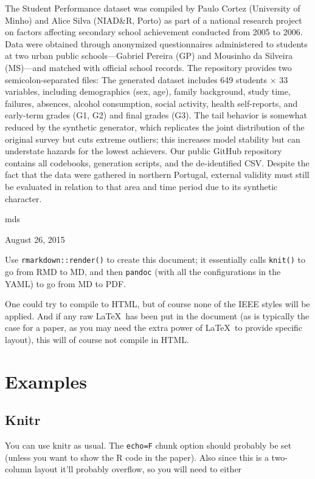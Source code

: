 \documentclass[a4paper,conference]{IEEEtran}
\begin{document}
The Student Performance dataset was compiled by Paulo Cortez (University
of Minho) and Alice Silva (NIAD\&R, Porto) as part of a national
research project on factors affecting secondary school achievement
conducted from 2005 to 2006. Data were obtained through anonymized
questionnaires administered to students at two urban public
schools---Gabriel Pereira (GP) and Mousinho da Silveira (MS)---and
matched with official school records. The repository provides two
semicolon-separated files: The generated dataset includes 649 students ×
33 variables, including demographics (sex, age), family background,
study time, failures, absences, alcohol consumption, social activity,
health self-reports, and early-term grades (G1, G2) and final grades
(G3). The tail behavior is somewhat reduced by the synthetic generator,
which replicates the joint distribution of the original survey but cuts
extreme outliers; this increases model stability but can understate
hazards for the lowest achievers. Our public GitHub repository contains
all codebooks, generation scripts, and the de-identified CSV. Despite
the fact that the data were gathered in northern Portugal, external
validity must still be evaluated in relation to that area and time
period due to its synthetic character.

\hfill mds

\hfill August 26, 2015

Use \texttt{rmarkdown::render()} to create this document; it essentially
calls \texttt{knit()} to go from RMD to MD, and then \texttt{pandoc}
(with all the configurations in the YAML) to go from MD to PDF.

One could try to compile to HTML, but of course none of the IEEE styles
will be applied. And if any raw \LaTeX~has been put in the document (as
is typically the case for a paper, as you may need the extra power of
\LaTeX~to provide specific layout), this will of course not compile in
HTML.

\section{Examples}\label{sec:examples}

\subsection{Knitr}\label{sec:knitr}

You can use knitr as usual. The \texttt{echo=F} chunk option should
probably be set (unless you want to show the R code in the paper). Also
since this is a two-column layout it'll probably overflow, so you will
need to either
\end{document}
